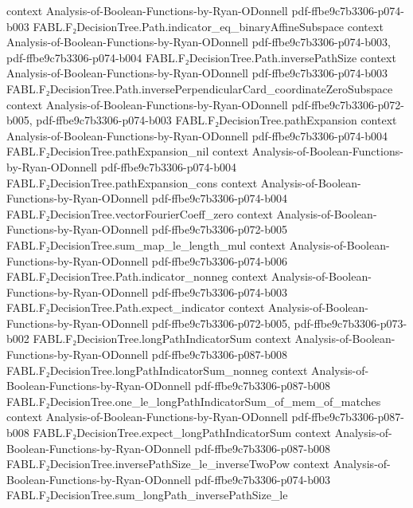 \begin{theorem}
  {context}
  {Analysis-of-Boolean-Functions-by-Ryan-ODonnell}
  {pdf-ffbe9c7b3306-p074-b003}
\proofstep
  {FABL.F₂DecisionTree.Path.indicator_eq_binaryAffineSubspace}
  {context}
  {Analysis-of-Boolean-Functions-by-Ryan-ODonnell}
  {pdf-ffbe9c7b3306-p074-b003,
    pdf-ffbe9c7b3306-p074-b004}
\proofstep
  {FABL.F₂DecisionTree.Path.inversePathSize}
  {context}
  {Analysis-of-Boolean-Functions-by-Ryan-ODonnell}
  {pdf-ffbe9c7b3306-p074-b003}
\proofstep
  {FABL.F₂DecisionTree.Path.inversePerpendicularCard_coordinateZeroSubspace}
  {context}
  {Analysis-of-Boolean-Functions-by-Ryan-ODonnell}
  {pdf-ffbe9c7b3306-p072-b005,
    pdf-ffbe9c7b3306-p074-b003}
\proofstep
  {FABL.F₂DecisionTree.pathExpansion}
  {context}
  {Analysis-of-Boolean-Functions-by-Ryan-ODonnell}
  {pdf-ffbe9c7b3306-p074-b004}
\proofstep
  {FABL.F₂DecisionTree.pathExpansion_nil}
  {context}
  {Analysis-of-Boolean-Functions-by-Ryan-ODonnell}
  {pdf-ffbe9c7b3306-p074-b004}
\proofstep
  {FABL.F₂DecisionTree.pathExpansion_cons}
  {context}
  {Analysis-of-Boolean-Functions-by-Ryan-ODonnell}
  {pdf-ffbe9c7b3306-p074-b004}
\proofstep
  {FABL.F₂DecisionTree.vectorFourierCoeff_zero}
  {context}
  {Analysis-of-Boolean-Functions-by-Ryan-ODonnell}
  {pdf-ffbe9c7b3306-p072-b005}
\proofstep
  {FABL.F₂DecisionTree.sum_map_le_length_mul}
  {context}
  {Analysis-of-Boolean-Functions-by-Ryan-ODonnell}
  {pdf-ffbe9c7b3306-p074-b006}
\proofstep
  {FABL.F₂DecisionTree.Path.indicator_nonneg}
  {context}
  {Analysis-of-Boolean-Functions-by-Ryan-ODonnell}
  {pdf-ffbe9c7b3306-p074-b003}
\proofstep
  {FABL.F₂DecisionTree.Path.expect_indicator}
  {context}
  {Analysis-of-Boolean-Functions-by-Ryan-ODonnell}
  {pdf-ffbe9c7b3306-p072-b005,
    pdf-ffbe9c7b3306-p073-b002}
\proofstep
  {FABL.F₂DecisionTree.longPathIndicatorSum}
  {context}
  {Analysis-of-Boolean-Functions-by-Ryan-ODonnell}
  {pdf-ffbe9c7b3306-p087-b008}
\proofstep
  {FABL.F₂DecisionTree.longPathIndicatorSum_nonneg}
  {context}
  {Analysis-of-Boolean-Functions-by-Ryan-ODonnell}
  {pdf-ffbe9c7b3306-p087-b008}
\proofstep
  {FABL.F₂DecisionTree.one_le_longPathIndicatorSum_of_mem_of_matches}
  {context}
  {Analysis-of-Boolean-Functions-by-Ryan-ODonnell}
  {pdf-ffbe9c7b3306-p087-b008}
\proofstep
  {FABL.F₂DecisionTree.expect_longPathIndicatorSum}
  {context}
  {Analysis-of-Boolean-Functions-by-Ryan-ODonnell}
  {pdf-ffbe9c7b3306-p087-b008}
\proofstep
  {FABL.F₂DecisionTree.inversePathSize_le_inverseTwoPow}
  {context}
  {Analysis-of-Boolean-Functions-by-Ryan-ODonnell}
  {pdf-ffbe9c7b3306-p074-b003}
\proofstep
  {FABL.F₂DecisionTree.sum_longPath_inversePathSize_le}

\end{theorem}
